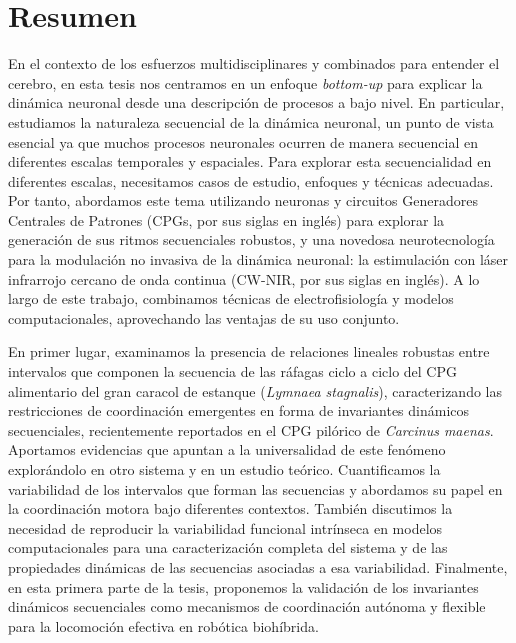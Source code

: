 \chapter*{Resumen}
En el contexto de los esfuerzos multidisciplinares y combinados para entender el cerebro, en esta tesis nos centramos en un enfoque \textit{bottom-up} para explicar la dinámica neuronal desde una descripción de procesos a bajo nivel. En particular, estudiamos la naturaleza secuencial de la dinámica neuronal, un punto de vista esencial ya que muchos procesos neuronales ocurren de manera secuencial en diferentes escalas temporales y espaciales. Para explorar esta secuencialidad en diferentes escalas, necesitamos casos de estudio, enfoques y técnicas adecuadas. Por tanto, abordamos este tema utilizando neuronas y circuitos Generadores Centrales de Patrones (CPGs, por sus siglas en inglés) para explorar la generación de sus ritmos secuenciales robustos, y una novedosa neurotecnología para la modulación no invasiva de la dinámica neuronal: la estimulación con láser infrarrojo cercano de onda continua (CW-NIR, por sus siglas en inglés). A lo largo de este trabajo, combinamos técnicas de electrofisiología y modelos computacionales, aprovechando las ventajas de su uso conjunto.

En primer lugar, examinamos la presencia de relaciones lineales robustas entre intervalos que componen la secuencia de las ráfagas ciclo a ciclo del CPG alimentario del gran caracol de estanque (\textit{Lymnaea stagnalis}), caracterizando las restricciones de coordinación emergentes en forma de invariantes dinámicos secuenciales, recientemente reportados en el CPG pilórico de \textit{Carcinus maenas}. Aportamos evidencias que apuntan a la universalidad de este fenómeno explorándolo en otro sistema y en un estudio teórico. Cuantificamos la variabilidad de los intervalos que forman las secuencias y abordamos su papel en la coordinación motora bajo diferentes contextos. También discutimos la necesidad de reproducir la variabilidad funcional intrínseca en modelos computacionales para una caracterización completa del sistema y de las propiedades dinámicas de las secuencias asociadas a esa variabilidad. Finalmente, en esta primera parte de la tesis, proponemos la validación de los invariantes dinámicos secuenciales como mecanismos de coordinación autónoma y flexible para la locomoción efectiva en robótica biohíbrida.

